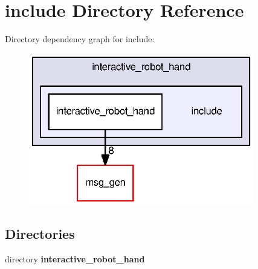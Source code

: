 \section{include Directory Reference}
\label{dir_29eb2c627d02311487a25864ac99a44f}
Directory dependency graph for include\-:
\nopagebreak
\begin{figure}[H]
\begin{center}
\leavevmode
\includegraphics[width=278pt]{dir_29eb2c627d02311487a25864ac99a44f_dep}
\end{center}
\end{figure}
\subsection*{Directories}
\begin{DoxyCompactItemize}
\item 
directory {\bf interactive\-\_\-robot\-\_\-hand}
\end{DoxyCompactItemize}
